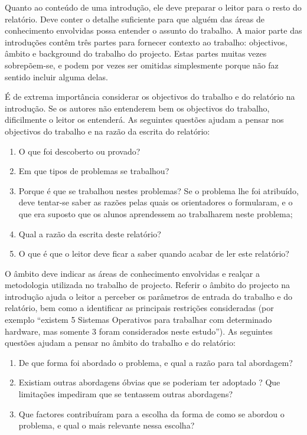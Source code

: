 Quanto ao conteúdo de uma introdução, ele deve preparar o leitor para o resto do relatório. Deve conter o detalhe suficiente para que alguém das áreas de conhecimento envolvidas possa entender o assunto do trabalho. A maior parte das introduções contêm três partes para fornecer contexto ao trabalho: objectivos, âmbito e background do trabalho do projecto. Estas partes muitas vezes sobrepõem-se, e podem por vezes ser omitidas simplesmente porque não faz sentido incluir alguma delas.

É de extrema importância considerar os objectivos do trabalho e do relatório na introdução. Se os autores não entenderem bem os objectivos do trabalho, dificilmente o leitor os entenderá. As seguintes questões ajudam a pensar nos objectivos do trabalho e na razão da escrita do relatório:

\begin{enumerate}
 \item O que foi descoberto ou provado?
 \item Em que tipos de problemas se trabalhou?
 \item Porque é que se trabalhou nestes problemas? Se o problema lhe foi atribuído, deve tentar-se saber as razões pelas quais os orientadores o formularam, e o que era suposto que os alunos aprendessem ao trabalharem neste problema;
 \item Qual a razão da escrita deste relatório?
 \item O que é que o leitor deve ficar a saber quando acabar de ler este relatório?
\end{enumerate}


O âmbito deve indicar as áreas de conhecimento envolvidas e realçar a metodologia utilizada no trabalho de projecto. Referir o âmbito do projecto na introdução ajuda o leitor a perceber os parâmetros de entrada do trabalho e do relatório, bem como a identificar as principais restrições consideradas (por exemplo “existem 5 Sistemas Operativos para trabalhar com determinado hardware, mas somente 3 foram considerados neste estudo”). As seguintes questões ajudam a pensar no âmbito do trabalho e do relatório:

\begin{enumerate}
 \item De que forma foi abordado o problema, e qual a razão para tal abordagem?
 \item Existiam outras abordagens óbvias que se poderiam ter adoptado ? Que limitações impediram que se tentassem outras abordagens?
 \item Que factores contribuíram para a escolha da forma de como se abordou o problema, e qual o mais relevante nessa escolha?
\end{enumerate}

